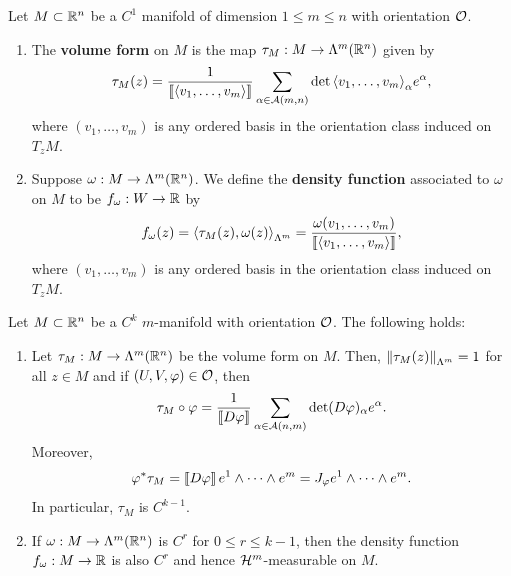 \documentclass[a4paper]{article}
\begin{document}
\begin{defi}
  Let $M \subset \mathbb{R}^n$ be a $C^1$ manifold of dimension $1 \leq m \leq n$
  with orientation $\mathcal{O}$.
  \begin{enumerate}
    \item The \textbf{volume form} on $M$ is the map $\tau_M : M \to
          \Lambda^m(\mathbb{R}^n)$ given by
          \[
            \tau_M(z) = \frac{1}{\left\llbracket \left\langle v_1, \dots, v_m \right\rangle \right\rrbracket}
            \sum_{\alpha \in \mathcal{A}(m, n)} \det
            {\left\langle v_1, \dots, v_m \right\rangle}_\alpha e^\alpha,
          \]
          where $(v_1, \dots, v_m)$ is any ordered basis in the
          orientation class induced on $T_z M$.

    \item Suppose $\omega : M \to \Lambda^m(\mathbb{R}^n)$. We define the
          \textbf{density function} associated to $\omega$ on $M$ to be
          $f_\omega : W \to \mathbb{R}$ by
          \[
            f_\omega (z) = \left\langle \tau_M(z), \omega(z) \right\rangle_{\Lambda^m}
            = \frac{\omega(v_1, \dots, v_m)}{\left\llbracket \left\langle v_1, \dots, v_m \right\rangle \right\rrbracket},
          \]
          where $(v_1, \dots, v_m)$ is any ordered basis in the
          orientation class induced on $T_z M$.
  \end{enumerate}
\end{defi}

\begin{prop}
  Let $M \subset \mathbb{R}^n$ be a $C^k$ $m$-manifold with orientation $\mathcal{O}$.
  The following holds:
  \begin{enumerate}
    \item Let $\tau_M : M \to \Lambda^m(\mathbb{R}^n)$ be the volume form on $M$.
          Then, $\left\lVert \tau_M(z)\right\rVert_{\Lambda^m} = 1$ for all $z \in M$ and
          if $(U, V, \varphi) \in \mathcal{O}$, then
          \[
            \tau_M \circ \varphi =
            \frac{1}{\left\llbracket D\varphi \right\rrbracket} \sum_{\alpha \in \mathcal{A}(n, m)}
            \det (D \varphi)_\alpha e^\alpha.
          \]
          Moreover,
          \[
            \varphi^* \tau_M = \left\llbracket D \varphi \right\rrbracket e^1 \wedge \dots \wedge
            e^m = J_\varphi e^1 \wedge \dots \wedge e^m.
          \]
          In particular, $\tau_M$ is $C^{k-1}$.

    \item If $\omega : M \to \Lambda^m(\mathbb{R}^n)$ is $C^r$ for $0 \leq r \leq
          k - 1$, then the density function $f_\omega : M \to \mathbb{R}$ is also
          $C^r$ and hence $\mathcal{H}^m$-measurable on $M$.
  \end{enumerate}
\end{prop}
\end{document}
